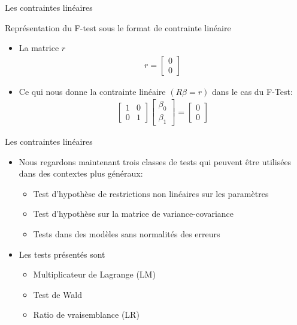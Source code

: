 \documentclass{beamer}
\begin{document}
\begin{frame}{Les contraintes linéaires}
\begin{block}{Représentation du F-test sous le format de contrainte linéaire}
\begin{itemize}
\item La matrice $r$
\begin{align*}
r= \begin{bmatrix}
0 \\
0
\end{bmatrix}
\end{align*}
\item Ce qui nous donne la contrainte linéaire $(R \beta=r)$ dans le cas du F-Test:
\begin{align*}
\begin{bmatrix}
1 & 0 \\
0 & 1 
\end{bmatrix}
\begin{bmatrix}
\beta_0 \\
\beta_1
\end{bmatrix}
=
\begin{bmatrix}
0 \\
0
\end{bmatrix}
\end{align*}
\end{itemize}
\end{block}
\end{frame}

\begin{frame}{Les contraintes linéaires}
\begin{itemize}
\item Nous regardons maintenant trois classes de tests qui peuvent être utilisées dans des contextes plus généraux:
\begin{itemize}
\item Test d’hypothèse de restrictions non linéaires sur les paramètres
\item Test d’hypothèse sur la matrice de variance-covariance
\item Tests dans des modèles sans normalités des erreurs
\end{itemize}
\item Les tests présentés sont
\begin{itemize}
\item Multiplicateur de Lagrange (LM)
\item Test de Wald 
\item Ratio de vraisemblance (LR)
\end{itemize}
\end{itemize}
\end{frame}
\end{document}
